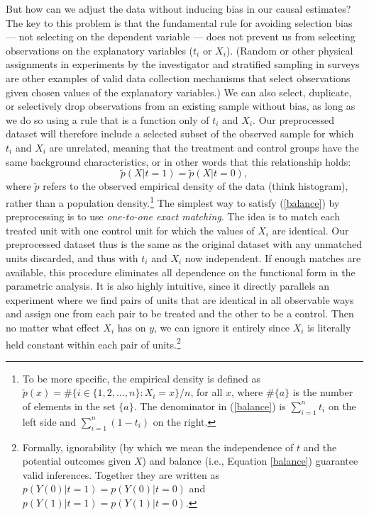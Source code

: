 \documentclass[11pt,titlepage]{article}
\begin{document}
But how can we adjust the data without inducing bias in our causal
estimates?  The key to this problem is that the fundamental rule for
avoiding selection bias --- not selecting on the dependent variable
--- does not prevent us from selecting observations on the explanatory
variables ($t_i$ or $X_i$).  (Random or other physical assignments in
experiments by the investigator and stratified sampling in surveys are
other examples of valid data collection mechanisms that select
observations given chosen values of the explanatory variables.)  We
can also select, duplicate, or selectively drop observations from an
existing sample without bias, as long as we do so using a rule that is
a function only of $t_i$ and $X_i$.  Our preprocessed dataset will
therefore include a selected subset of the observed sample for which
$t_i$ and $X_i$ are unrelated, meaning that the treatment and control
groups have the same background characteristics, or in other words
that this relationship holds:
\begin{equation}
  \label{balance}
  \tilde p(X|t=1) = \tilde p(X|t=0),
\end{equation}
where $\tilde p$ refers to the observed empirical density of the data
(think histogram), rather than a population density.\footnote{To be
  more specific, the empirical density is defined as $\tilde p(x) = \#
  \{ i\in \{1, 2, \dots, n \}: X_i = x \} / n$, for all $x$, where
  $\#\{a\}$ is the number of elements in the set $\{a\}$.  The
  denominator in (\ref{balance}) is $\sum_{i=1}^n t_i$ on the left
  side and $\sum_{i=1}^n (1-t_i)$ on the right.}  The simplest way to
satisfy (\ref{balance}) by preprocessing is to use \emph{one-to-one
  exact matching}.  The idea is to match each treated unit with one
control unit for which the values of $X_i$ are identical.  Our
preprocessed dataset thus is the same as the original dataset with any
unmatched units discarded, and thus with $t_i$ and $X_i$ now
independent.  If enough matches are available, this procedure
eliminates all dependence on the functional form in the parametric
analysis.  It is also highly intuitive, since it directly parallels an
experiment where we find pairs of units that are identical in all
observable ways and assign one from each pair to be treated and the
other to be a control.  Then no matter what effect $X_i$ has on $y$,
we can ignore it entirely since $X_i$ is literally held constant
within each pair of units.\footnote{Formally, ignorability (by which
  we mean the independence of $t$ and the potential outcomes given
  $X$) and balance (i.e., Equation \ref{balance}) guarantee valid
  inferences. Together they are written as
  $p(Y(0)|t=1)=p(Y(0)|t=0)$ and $p(Y(1)|t=1)=p(Y(1)|t=0)$.}
\end{document}
